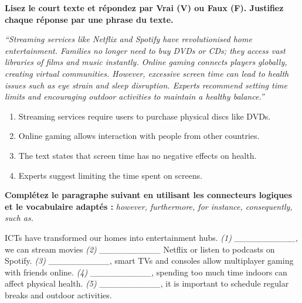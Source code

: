 \documentclass[11pt]{article}
\begin{document}
\begin{exercice}
\textbf{Lisez le court texte et répondez par Vrai (V) ou Faux (F). Justifiez chaque réponse par une phrase du texte.}

\textit{``Streaming services like Netflix and Spotify have revolutionised home entertainment. Families no longer need to buy DVDs or CDs; they access vast libraries of films and music instantly. Online gaming connects players globally, creating virtual communities. However, excessive screen time can lead to health issues such as eye strain and sleep disruption. Experts recommend setting time limits and encouraging outdoor activities to maintain a healthy balance.''}

\begin{enumerate}
    \item Streaming services require users to purchase physical discs like DVDs.
    \item Online gaming allows interaction with people from other countries.
    \item The text states that screen time has no negative effects on health.
    \item Experts suggest limiting the time spent on screens.
\end{enumerate}
\end{exercice}

\begin{exercice}
\textbf{Complétez le paragraphe suivant en utilisant les connecteurs logiques et le vocabulaire adaptés :} \textit{however, furthermore, for instance, consequently, such as.}

ICTs have transformed our homes into entertainment hubs. \textit{(1) \_\_\_\_\_\_\_\_\_\_}, we can stream movies \textit{(2) \_\_\_\_\_\_\_\_\_\_} Netflix or listen to podcasts on Spotify. \textit{(3) \_\_\_\_\_\_\_\_\_\_}, smart TVs and consoles allow multiplayer gaming with friends online. \textit{(4) \_\_\_\_\_\_\_\_\_\_}, spending too much time indoors can affect physical health. \textit{(5) \_\_\_\_\_\_\_\_\_\_}, it is important to schedule regular breaks and outdoor activities.
\end{exercice}
\end{document}
